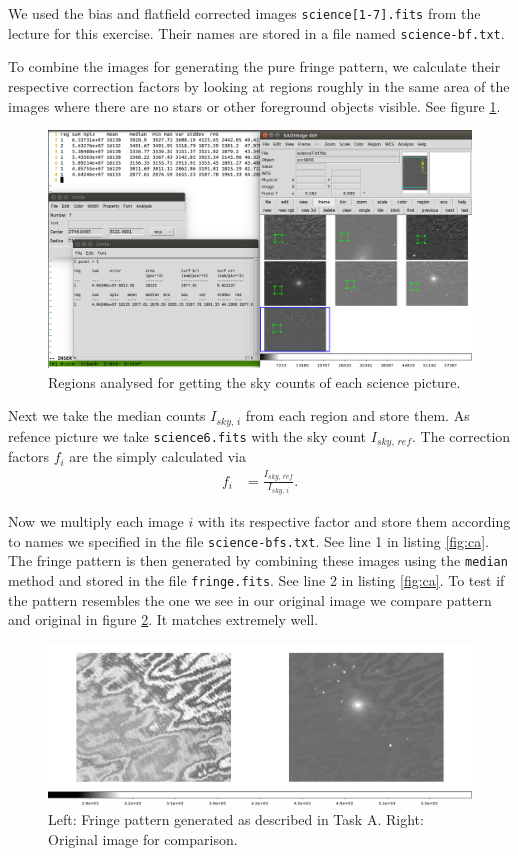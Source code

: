 \documentclass[11pt,a4paper,twoside]{article}
\begin{document}
We used the bias and flatfield corrected images \verb+science[1-7].fits+ from
the lecture for this exercise. Their names are stored in a file named 
\verb+science-bf.txt+.

To combine the images for generating the pure fringe pattern, we calculate their
respective correction factors by looking at regions roughly in the same area
of the images where there are no stars or other foreground objects visible.
See figure \ref{fig:reg}.

\begin{figure}[h!]
\centering
\includegraphics[width=\linewidth]{./pic/regions}
\caption{Regions analysed for getting the sky counts of each science picture.}
\label{fig:reg}
\end{figure}

Next we take the median counts $I_{sky,\,i}$ from each region and store them.
As refence picture we take \verb+science6.fits+ with the sky count $I_{sky,\,ref}$.
The correction factors $f_i$ are the simply calculated via
\begin{align}
    f_i &= \frac{I_{sky,\,ref}}{I_{sky,\,i}} .
\end{align}

Now we multiply each image $i$ with its respective factor and store them
according to names we specified in the file \verb+science-bfs.txt+.
See line 1 in listing \ref{fig:ca}. The fringe pattern is then generated
by combining these images using the \verb+median+ method and stored in the
file \verb+fringe.fits+. See line 2 in listing \ref{fig:ca}. To test if the
pattern resembles the one we see in our original image we compare pattern
and original in figure \ref{fig:fr}. It matches extremely well.

\begin{figure}[h!]
\centering
\includegraphics[width=\linewidth]{./pic/fringes}
\caption{Left: Fringe pattern generated as described in Task A. Right:
         Original image for comparison.}
\label{fig:fr}
\end{figure}
\end{document}
